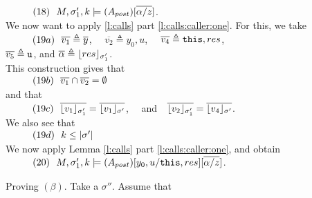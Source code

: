 \begin{description}
\\
$\SPS (18) \ \  \satDAssertFrom M  {\sigma_1'} {k}   {(A_{post})[\overline{\alpha/z}]}$.
\\
We now want to apply  \ref{l:calls} part \ref{l:calls:caller:one}. For this, we take
\\
$\SPS (19a) \ \  \overline {v_1} \triangleq \overline y$, \ \ $\overline {v_2} \triangleq  y_0, u$, \ \ $\overline {v_4} \triangleq  \prg{this}, res$, \\ $\overline {v_5} \triangleq  \prg{u}$, and
$\overline \alpha \triangleq \interpret {\sigma_1'} {res}$.
\\
This construction gives that  \\
$\SPS (19b) \ \  \overline {v_1}\cap   \overline{v_2} = \emptyset $
\\
and that
\\
$\SPS (19c) \ \ \overline {\interpret {\sigma_1'} {v_1} } = \overline {\interpret {\sigma'} {v_1} }$, \ \ and\ \  $\overline {\interpret {\sigma_1'}  {v_2} } = \overline {\interpret {\sigma'} {v_4} }$.
\\
We also see that \\
$\SPS (19d) \ \ k \leq \DepthSt {\sigma'}$
\\
We now apply Lemma \ref{l:calls} part \ref{l:calls:caller:one}, and obtain \\
$\SPS (20) \ \ \satDAssertFrom M  {\sigma_1'} {k}   {(A_{post})[y_0,u/\prg{this},res][\overline{\alpha/z}]}$.





 \vspace{.1cm}
Proving $(\beta)$. Take a $\sigma''$. Assume that\\
%



\end{description}
